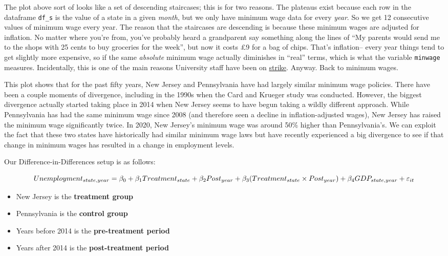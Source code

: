 \documentclass[
  letterpaper,
  DIV=11,
  numbers=noendperiod]{scrreprt}
\providecommand{\tightlist}{%
  \setlength{\itemsep}{0pt}\setlength{\parskip}{0pt}}\usepackage{longtable,booktabs,array}
\begin{document}
The plot above sort of looks like a set of descending staircases; this
is for two reasons. The plateaus exist because each row in the dataframe
\texttt{df\_s} is the value of a state in a given \emph{month}, but we
only have minimum wage data for every \emph{year}. So we get 12
consecutive values of minimum wage every year. The reason that the
staircases are descending is because these minimum wages are adjusted
for inflation. No matter where you're from, you've probably heard a
grandparent say something along the lines of ``My parents would send me
to the shops with 25 cents to buy groceries for the week'', but now it
costs £9 for a bag of chips. That's inflation-- every year things tend
to get slightly more expensive, so if the same \emph{absolute} minimum
wage actually diminishes in ``real'' terms, which is what the variable
\texttt{minwage} measures. Incidentally, this is one of the main reasons
University staff have been on
\href{https://www.ucu.org.uk/article/11830/University-staff-pay-cut-by-20-new-figures-show}{strike}.
Anyway. Back to minimum wages.

This plot shows that for the past fifty years, New Jersey and
Pennsylvania have had largely similar minimum wage policies. There have
been a couple moments of divergence, including in the 1990s when the
Card and Krueger study was conducted. However, the biggest divergence
actually started taking place in 2014 when New Jersey seems to have
begun taking a wildly different approach. While Pennsylvania has had the
same minimum wage since 2008 (and therefore seen a decline in
inflation-adjusted wages), New Jersey has raised the minimum wage
significantly twice. In 2020, New Jersey's minimum wage was around 50\%
higher than Pennsylvania's. We can exploit the fact that these two
states have historically had similar minimum wage laws but have recently
experienced a big divergence to see if that change in minimum wages has
resulted in a change in employment levels.

Our Difference-in-Differences setup is as follows:

\[\large Unemployment_{state, year} = \beta_0 + \beta_1 Treatment_{state} + \beta_2 Post_{year} + \beta_3 (Treatment_{state} \times Post_{year}) + \beta_4 GDP_{state,year} + \varepsilon_{it}\]

\begin{itemize}
\tightlist
\item
  New Jersey is the \textbf{treatment group}
\item
  Pennsylvania is the \textbf{control group}
\item
  Years before 2014 is the \textbf{pre-treatment period}
\item
  Years after 2014 is the \textbf{post-treatment period}
\end{itemize}
\end{document}
